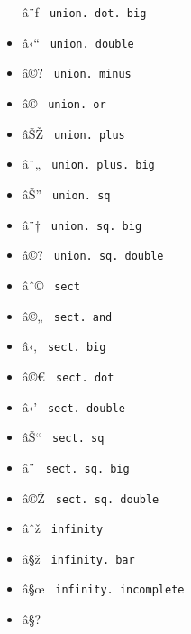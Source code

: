 \begin{itemize}
  \label{symbol-union.dot.big}{{ â¨ƒ }
  \texttt{\ union.\ dot.\ big\ }}
\item
  \label{symbol-union.double}{{ â‹`` }
  \texttt{\ union.\ double\ }}
\item
  \label{symbol-union.minus}{{ â©? }
  \texttt{\ union.\ minus\ }}
\item
  \label{symbol-union.or}{{ â© } \texttt{\ union.\ or\ }}
\item
  \label{symbol-union.plus}{{ âŠŽ }
  \texttt{\ union.\ plus\ }}
\item
  \label{symbol-union.plus.big}{{ â¨„ }
  \texttt{\ union.\ plus.\ big\ }}
\item
  \label{symbol-union.sq}{{ âŠ'' }
  \texttt{\ union.\ sq\ }}
\item
  \label{symbol-union.sq.big}{{ â¨† }
  \texttt{\ union.\ sq.\ big\ }}
\item
  \label{symbol-union.sq.double}{{ â©? }
  \texttt{\ union.\ sq.\ double\ }}
\item
  \label{symbol-sect}{{ âˆ© } \texttt{\ sect\ }}
\item
  \label{symbol-sect.and}{{ â©„ }
  \texttt{\ sect.\ and\ }}
\item
  \label{symbol-sect.big}{{ â‹‚ }
  \texttt{\ sect.\ big\ }}
\item
  \label{symbol-sect.dot}{{ â©€ }
  \texttt{\ sect.\ dot\ }}
\item
  \label{symbol-sect.double}{{ â‹' }
  \texttt{\ sect.\ double\ }}
\item
  \label{symbol-sect.sq}{{ âŠ`` } \texttt{\ sect.\ sq\ }}
\item
  \label{symbol-sect.sq.big}{{ â¨ }
  \texttt{\ sect.\ sq.\ big\ }}
\item
  \label{symbol-sect.sq.double}{{ â©Ž }
  \texttt{\ sect.\ sq.\ double\ }}
\item
  \label{symbol-infinity}{{ âˆž } \texttt{\ infinity\ }}
\item
  \label{symbol-infinity.bar}{{ â§ž }
  \texttt{\ infinity.\ bar\ }}
\item
  \label{symbol-infinity.incomplete}{{ â§œ }
  \texttt{\ infinity.\ incomplete\ }}
\item
  \label{symbol-infinity.tie}{{ â§? }
}
\end{itemize}
